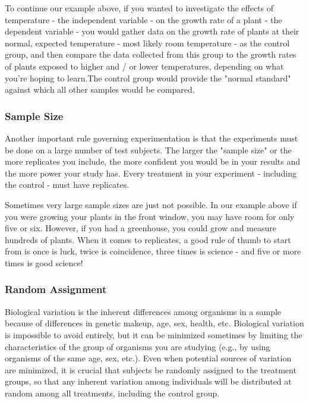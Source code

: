 \documentclass[
]{book}
\begin{document}
To continue our example above, if you wanted to investigate the effects of temperature - the independent variable - on the growth rate of a plant - the dependent variable - you would gather data on the growth rate of plants at their normal, expected temperature - most likely room temperature - as the control group, and then compare the data collected from this group to the growth rates of plants exposed to higher and / or lower temperatures, depending on what you're hoping to learn.The control group would provide the "normal standard" against which all other samples would be compared.

\hypertarget{sample-size}{%
\subsubsection*{Sample Size}\label{sample-size}}

Another important rule governing experimentation is that the experiments must be done on a large number of test subjects. The larger the "sample size" or the more replicates you include, the more confident you would be in your results and the more power your study has. Every treatment in your experiment - including the control - must have replicates.

Sometimes very large sample sizes are just not possible. In our example above if you were growing your plants in the front window, you may have room for only five or six. However, if you had a greenhouse, you could grow and measure hundreds of plants. When it comes to replicates, a good rule of thumb to start from is once is luck, twice is coincidence, three times is science - and five or more times is good science!

\hypertarget{random-assignment}{%
\subsubsection*{Random Assignment}\label{random-assignment}}

Biological variation is the inherent differences among organisms in a sample because of differences in genetic makeup, age, sex, health, etc. Biological variation is impossible to avoid entirely, but it can be minimized sometimes by limiting the characteristics of the group of organisms you are studying (e.g., by using organisms of the same age, sex, etc.). Even when potential sources of variation are minimized, it is crucial that subjects be randomly assigned to the treatment groups, so that any inherent variation among individuals will be distributed at random among all treatments, including the control group.
\end{document}
